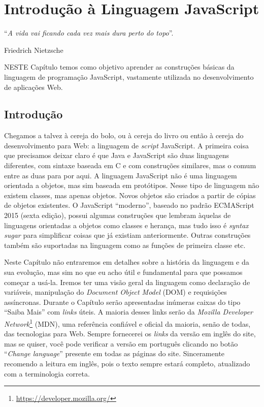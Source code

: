 \chapter{Introdução à Linguagem JavaScript}\label{cap:javaScript}
\epigraph{``\textit{A vida vai ficando cada vez mais dura perto do topo}''.}{Friedrich Nietzsche}

\lettrine[lines=4, lhang=0.1, lraise=0, loversize=0.2, findent=0.1em]{\textcolor{corAzulTema}{N}}{ESTE} Capítulo temos como objetivo aprender as construções básicas da linguagem de programação JavaScript, vastamente utilizada no desenvolvimento de aplicações Web.

\section{Introdução}

Chegamos a talvez à cereja do bolo, ou à cereja do livro ou então à cereja do desenvolvimento para Web: a linguagem de \textit{script} JavaScript. A primeira coisa que precisamos deixar claro é que Java e JavaScript são duas linguagens diferentes, com sintaxe baseada em C e com construções similares, mas o comum entre as duas para por aqui. A linguagem JavaScript não é uma linguagem orientada a objetos, mas sim baseada em protótipos. Nesse tipo de linguagem não existem classes, mas apenas objetos. Novos objetos são criados a partir de cópias de objetos existentes. O JavaScript ``moderno'', baseado no padrão ECMAScript 2015 (sexta edição), possui algumas construções que lembram àquelas de linguagens orientadas a objetos como classes e herança, mas tudo isso é \textit{syntax sugar} para simplificar coisas que já existiam anteriormente. Outras construções também são suportadas na linguagem como as funções de primeira classe etc.

Neste Capítulo não entraremos em detalhes sobre a história da linguagem e da sua evolução, mas sim no que eu acho útil e fundamental para que possamos começar a usá-la. Iremos ter uma visão geral da linguagem como declaração de variáveis, manipulação do \textit{Document Object Model} (DOM) e requisições assíncronas. Durante o Capítulo serão apresentadas inúmeras caixas do tipo ``Saiba Mais'' com \textit{links} úteis. A maioria desses links serão da \textit{Mozilla Developer Network}\footnote{\url{https://developer.mozilla.org/}} (MDN), uma referência confiável e oficial da maioria, senão de todas, das tecnologias para Web. Sempre fornecerei os \textit{links} da versão em inglês do site, mas se quiser, você pode verificar a versão em português clicando no botão ``\textit{Change language}'' presente em todas as páginas do site. Sinceramente recomendo a leitura em inglês, pois o texto sempre estará completo, atualizado com a terminologia correta.

